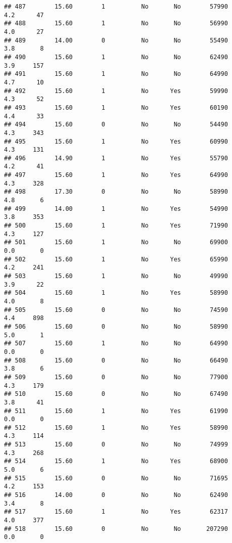 \documentclass[
]{article}
\begin{document}
\begin{verbatim}
## 487        15.60        1          No       No        57990         4.2      47
## 488        15.60        1          No       No        56990         4.0      27
## 489        14.00        0          No       No        55490         3.8       8
## 490        15.60        1          No       No        62490         3.9     157
## 491        15.60        1          No       No        64990         4.7      10
## 492        15.60        1          No      Yes        59990         4.3      52
## 493        15.60        1          No      Yes        60190         4.4      33
## 494        15.60        0          No       No        54490         4.3     343
## 495        15.60        1          No      Yes        60990         4.3     131
## 496        14.90        1          No      Yes        55790         4.2      41
## 497        15.60        1          No      Yes        64990         4.3     328
## 498        17.30        0          No       No        58990         4.8       6
## 499        14.00        1          No      Yes        54990         3.8     353
## 500        15.60        1          No      Yes        71990         4.3     127
## 501        15.60        1          No       No        69900         0.0       0
## 502        15.60        1          No      Yes        65990         4.2     241
## 503        15.60        1          No       No        49990         3.9      22
## 504        15.60        1          No      Yes        58990         4.0       8
## 505        15.60        0          No       No        74590         4.4     898
## 506        15.60        0          No       No        58990         5.0       1
## 507        15.60        1          No       No        64990         0.0       0
## 508        15.60        0          No       No        66490         3.8       6
## 509        15.60        0          No       No        77900         4.3     179
## 510        15.60        0          No       No        67490         3.8      41
## 511        15.60        1          No      Yes        61990         0.0       0
## 512        15.60        1          No      Yes        58990         4.3     114
## 513        15.60        0          No       No        74999         4.3     268
## 514        15.60        1          No      Yes        68900         5.0       6
## 515        15.60        0          No       No        71695         4.2     153
## 516        14.00        0          No       No        62490         3.4       8
## 517        15.60        1          No      Yes        62317         4.0     377
## 518        15.60        0          No       No       207290         0.0       0

\end{verbatim}
\end{document}
